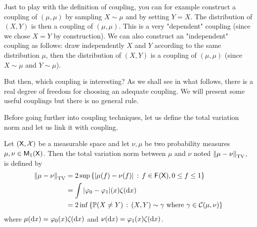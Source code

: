 \documentclass[english,graybox,envcountchap,envcountsame,sectrefs,shortlabels]{svmono}
\theoremstyle{style}
\begin{document}
Just to play with the definition of coupling, you can for example construct a coupling of $(\mu,\mu)$ by sampling $X\sim\mu$ and by setting $Y=X$. The distribution of $(X,Y)$ is then a coupling of $(\mu,\mu)$. This is a very "dependent" coupling (since we chose $X=Y$ by construction). We can also construct an "independent" coupling as follows: draw independently $X$ and $Y$ according to the same distribution $\mu$, then the distribution of $(X,Y)$ is a coupling of $(\mu,\mu)$ (since $X\sim \mu$ and $Y\sim \mu$).

But then, which coupling is interesting? As we shall see in what follows, there is a real degree of freedom for choosing an adequate coupling. We will present some useful couplings but there is no general rule.

Before going further into coupling techniques, let us define the total variation norm and let us link it with coupling.
\begin{shaded}
\begin{definition} \label{def:totvar}
Let $(\mathsf{X},\mathcal{X})$ be a measurable space and let $\nu,\mu$ be two probability measures $\mu,\nu \in \mathsf{M}_{1}(\mathsf{X})$. Then the total variation norm between $\mu$ and $\nu$ noted $\left\|\mu-\nu\right\|_{\mathrm{TV}}$, is defined by
\begin{align}
\left\|\mu-\nu\right\|_{\mathrm{TV}}&=2\sup\left\{ |\mu(f)-\nu(f)|\,:\,f\in \mathsf{F_{}}(\mathsf{X}), 0\leq f\leq 1\right\} \label{eq:def:totvar:one}\\
&=\int |\varphi_0-\varphi_1|(x) \zeta(\mathrm{d} x) \label{eq:def:totvar:two}\\
&=2\inf\left\{ \mathbb{P}(X\neq Y) \,:\, (X,Y) \sim \gamma \mbox{ where } \gamma \in \mathcal{C}(\mu,\nu)\right\} \label{eq:def:totvar:three}
\end{align}
where $\mu(\mathrm{d} x)=\varphi_0(x) \zeta(\mathrm{d} x)$ and $\nu(\mathrm{d} x)=\varphi_1(x) \zeta(\mathrm{d} x)$.
\end{definition}

\end{shaded}
\end{document}
